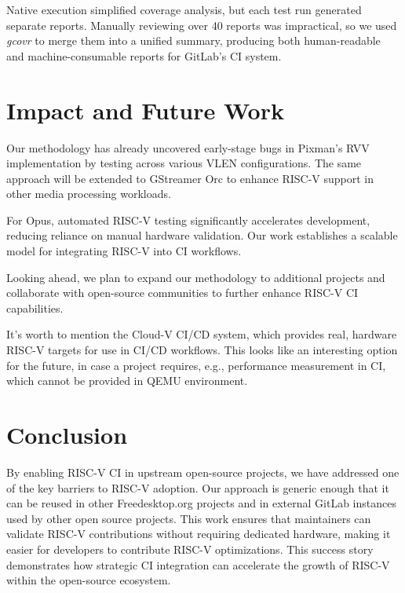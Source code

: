 \documentclass[
	a4paper, %
	10pt, %
	unnumberedsections, %
	twoside, %
]{LTJournalArticle}
\begin{document}
Native execution simplified coverage analysis, but each test run generated separate reports. Manually reviewing over 40 reports was impractical, so we used \emph{gcovr}\autocite{gcovr} to merge them into a unified summary, producing both human-readable and machine-consumable reports for GitLab’s CI system\autocite{gitlab-cov}.

\section{Impact and Future Work}

Our methodology has already uncovered early-stage bugs in Pixman's RVV implementation by testing across various VLEN configurations. The same approach will be extended to GStreamer Orc to enhance RISC-V support in other media processing workloads.

For Opus, automated RISC-V testing significantly accelerates development, reducing reliance on manual hardware validation. Our work establishes a scalable model for integrating RISC-V into CI workflows.

Looking ahead, we plan to expand our methodology to additional projects and collaborate with open-source communities to further enhance RISC-V CI capabilities.

It's worth to mention the Cloud-V CI/CD system\autocite{cloudv}, which provides real, hardware RISC-V targets for use in CI/CD workflows. This looks like an interesting option for the future, in case a project requires, e.g., performance measurement in CI, which cannot be provided in QEMU environment.

\section{Conclusion}

By enabling RISC-V CI in upstream open-source projects, we have addressed one of the key barriers to RISC-V adoption. Our approach is generic enough that it can be reused in other Freedesktop.org projects and in external GitLab instances used by other open source projects. This work ensures that maintainers can validate RISC-V contributions without requiring dedicated hardware, making it easier for developers to contribute RISC-V optimizations. This success story demonstrates how strategic CI integration can accelerate the growth of RISC-V within the open-source ecosystem.


\printbibliography %



\end{document}
